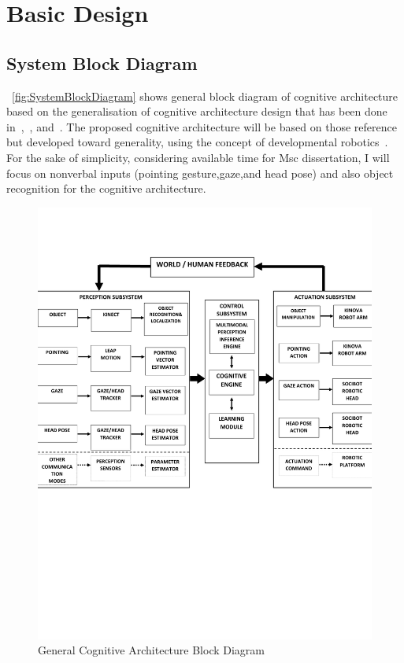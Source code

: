 \documentclass[11pt]{article}
\begin{document}
	\section{Basic Design}
		\subsection{System Block Diagram}
		\label{subsec:SystemBlockDiagram}
		~\autoref{fig:SystemBlockDiagram} shows general block diagram of cognitive architecture based on the generalisation of cognitive architecture design that has been done in~\cite{gordon2010neuromorphically},~\cite{forster2009robots}, and~\cite{vernon2011roadmap}. The proposed cognitive architecture will be based on those reference but developed toward generality, using the concept of developmental robotics~\cite{cangelosi2015developmental}. For the sake of simplicity, considering available time for Msc dissertation, I will focus on nonverbal inputs (pointing gesture,gaze,and head pose) and also object recognition for the cognitive architecture. 
			\begin{figure}[H]
				\includegraphics{BlockDiagram}
				\caption{General Cognitive Architecture Block Diagram \label{fig:SystemBlockDiagram}}
			\end{figure}
\end{document}
